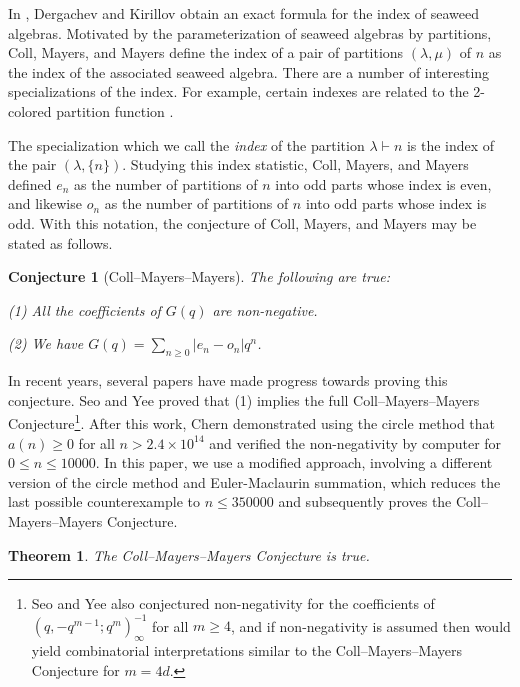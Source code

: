 \documentclass[11pt,reqno]{amsart}
\newtheorem{theorem}{Theorem}[section]
\theoremstyle{definition}
\theoremstyle{plain}
\theoremstyle{named}
\newtheorem*{namedconjecture}{Conjecture}
\numberwithin{equation}{section}
\theoremstyle{example}
\def\lp{\left(}
\def\rp{\right)}
\begin{document}
In \cite[Theorem 5.1]{DergachevKirillov}, Dergachev and Kirillov obtain an exact formula for the index of seaweed algebras. Motivated by the parameterization of seaweed algebras by partitions, Coll, Mayers, and Mayers define the index of a pair of partitions $\lp \lambda, \mu \rp$ of $n$ as the index of the associated seaweed algebra. There are a number of interesting specializations of the index. For example, certain indexes are related to the 2-colored partition function \cite{CollMayersMayers}.

The specialization which we call the {\it index} of the partition $\lambda \vdash n$ is the index of the pair $\lp \lambda, \{ n \} \rp$. Studying this index statistic, Coll, Mayers, and Mayers defined $e_n$ as the number of partitions of $n$ into odd parts whose index is even, and likewise $o_n$ as the number of partitions of $n$ into odd parts whose index is odd. With this notation, the conjecture of Coll, Mayers, and Mayers may be stated as follows.

\begin{namedconjecture}[Coll--Mayers--Mayers] \label{MAIN CONJECTURE}
The following are true:

\noindent \textnormal{(1)} All the coefficients of $G(q)$ are non-negative.

\noindent \textnormal{(2)} We have $G(q) = \sum\limits_{n \geq 0} \left| e_n - o_n \right| q^n$.
\end{namedconjecture}

In recent years, several papers have made progress towards proving this conjecture. Seo and Yee \cite{SeoYee} proved that (1) implies the full Coll--Mayers--Mayers Conjecture\footnote{Seo and Yee also conjectured non-negativity for the coefficients of $\lp q, -q^{m-1}; q^m \rp_\infty^{-1}$ for all $m \geq 4$, and if non-negativity is assumed then \cite[Corollary 3]{SeoYee} would yield combinatorial interpretations similar to the Coll--Mayers--Mayers Conjecture for $m = 4d$.}. After this work, Chern \cite{Chern} demonstrated using the circle method that $a(n) \geq 0$ for all $n > 2.4 \times 10^{14}$ and verified the non-negativity by computer for $0 \leq n \leq 10000$. In this paper, we use a modified approach, involving a different version of the circle method and Euler-Maclaurin summation, which reduces the last possible counterexample to $n \leq 350000$ and subsequently proves the Coll--Mayers--Mayers Conjecture.

\begin{theorem} \label{MAIN}
The Coll--Mayers--Mayers Conjecture is true.
\end{theorem}
\end{document}
